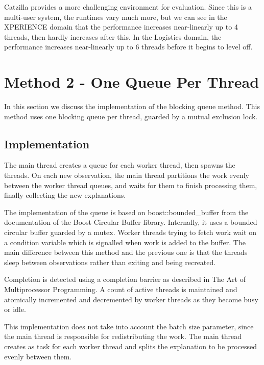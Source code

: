\documentclass[12pt,twoside,abbrevs,msc,ai,notimes,logo,sansheadings]{infthesis}
\begin{document}
  Catzilla provides a more challenging environment for evaluation. Since this is a multi-user system, the runtimes vary much more, but we can see in the XPERIENCE domain that the performance increases near-linearly up to 4 threads, then hardly increases after this. In the Logistics domain, the performance increases near-linearly up to 6 threads before it begins to level off.
  
  \chapter {Method 2 - One Queue Per Thread}
  
  In this section we discuss the implementation of the blocking queue method. This method uses one blocking queue per thread, guarded by a mutual exclusion lock.
  
  \section {Implementation}
  
  The main thread creates a queue for each worker thread, then spawns the threads. On each new observation, the main thread partitions the work evenly between the worker thread queues, and waits for them to finish processing them, finally collecting the new explanations.
  
  The implementation of the queue is based on boost::bounded\_buffer from the documentation of the Boost Circular Buffer library. Internally, it uses a bounded circular buffer guarded by a mutex. Worker threads trying to fetch work wait on a condition variable which is signalled when work is added to the buffer. The main difference between this method and the previous one is that the threads sleep between observations rather than exiting and being recreated.
  
  Completion is detected using a completion barrier as described in The Art of Multiprocessor Programming\cite{bib:aomp}. A count of active threads is maintained and atomically incremented and decremented by worker threads as they become busy or idle.
  
  This implementation does not take into account the batch size parameter, since the main thread is responsible for redistributing the work. The main thread creates as task for each worker thread and splits the explanation to be processed evenly between them.
  
\end{document}
